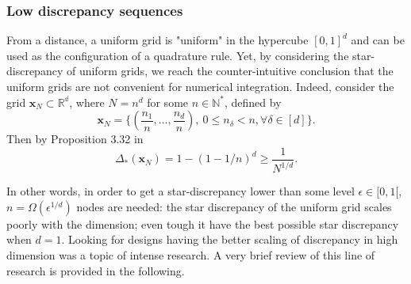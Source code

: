 \documentclass[twoside,11pt]{book}
\newtheorem{theorem}{Theorem}
\numberwithin{theorem}{chapter}
\numberwithin{definition}{chapter}
\numberwithin{proposition}{chapter}
\numberwithin{corollary}{chapter}
\numberwithin{example}{chapter}
\numberwithin{lemma}{chapter}
\begin{document}




\subsubsection{Low discrepancy sequences}


From a distance, a uniform grid is "uniform" in the hypercube $[0,1]^{d}$ and can be used as the configuration of a quadrature rule. Yet, by considering the star-discrepancy of uniform grids, we reach the counter-intuitive conclusion that the uniform grids are not convenient for numerical integration. Indeed, consider the grid $\bm{x}_{N}  \subset \mathbb{R^{d}}$, where $N = n^{d}$ for some $n \in \mathbb{N}^{*}$, defined by
\begin{equation}
\bm{x}_{N} = \bigg\{ (\frac{n_{1}}{n}, \dots, \frac{n_{d}}{n}), \: 0 \leq n_{\delta} < n, \forall \delta \in [d] \bigg\}. 
\end{equation}
Then by Proposition 3.32 in \citep{DiPi10}
\begin{equation}
\Delta_{*}(\bm{x}_{N}) = 1- (1-1/n)^{d} \geq \frac{1}{N^{1/d}}. 
\end{equation} 


In other words, in order to get a star-discrepancy lower than some level $\epsilon \in [0,1[$, $n = \Omega(\epsilon^{1/d})$ nodes are needed: the star discrepancy of the uniform grid scales poorly with the dimension; even tough it have the best possible star discrepancy when $d = 1$.  Looking for designs having the better scaling of discrepancy in high dimension was a topic of intense research.  A very brief review of this line of research is provided in the following. 
 
\end{document}
